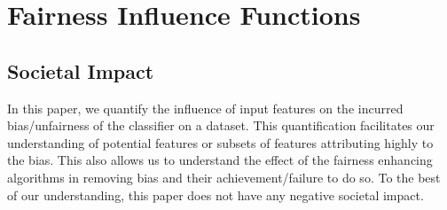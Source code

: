 \appendix
\chapter{Fairness Influence Functions}
\section{Societal Impact}
In this paper, we quantify the influence of input features on the incurred bias/unfairness of the classifier on a dataset. This quantification facilitates our understanding of potential features or subsets of features attributing highly to the bias. This also allows us to understand the effect of the fairness enhancing algorithms in removing bias and their achievement/failure to do so. To the best of our understanding, this paper does not have any negative societal impact. 



